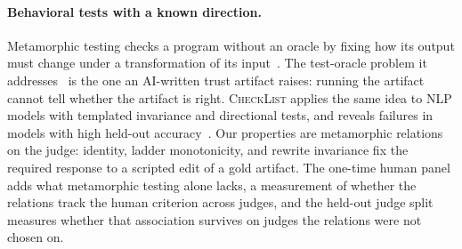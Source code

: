 \paragraph{Behavioral tests with a known direction.}
Metamorphic testing checks a program without an oracle by fixing how its output must change under a transformation of its input~\citep{chen1998metamorphic}.
The test-oracle problem it addresses~\citep{barr2015oracle} is the one an AI-written trust artifact raises: running the artifact cannot tell whether the artifact is right.
\textsc{CheckList} applies the same idea to NLP models with templated invariance and directional tests, and reveals failures in models with high held-out accuracy~\citep{ribeiro2020checklist}.
Our properties are metamorphic relations on the judge: identity, ladder monotonicity, and rewrite invariance fix the required response to a scripted edit of a gold artifact.
The one-time human panel adds what metamorphic testing alone lacks, a measurement of whether the relations track the human criterion across judges, and the held-out judge split measures whether that association survives on judges the relations were not chosen on.
